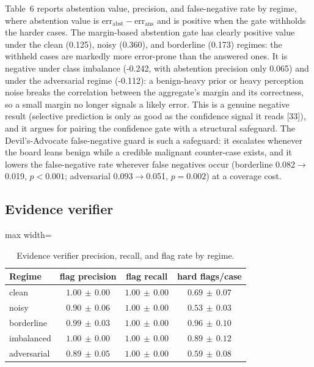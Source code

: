 \documentclass[12pt]{article}
\begin{document}
Table~6 reports abstention value, precision, and false-negative rate by regime, where abstention value is $\mathrm{err}_{\mathrm{abst}}-\mathrm{err}_{\mathrm{ans}}$ and is positive when the gate withholds the harder cases. The margin-based abstention gate has clearly positive value under the clean (0.125), noisy (0.360), and borderline (0.173) regimes: the withheld cases are markedly more error-prone than the answered ones. It is negative under class imbalance (-0.242, with abstention precision only 0.065) and under the adversarial regime (-0.112): a benign-heavy prior or heavy perception noise breaks the correlation between the aggregate's margin and its correctness, so a small margin no longer signals a likely error. This is a genuine negative result (selective prediction is only as good as the confidence signal it reads [33]), and it argues for pairing the confidence gate with a structural safeguard. The Devil's-Advocate false-negative guard is such a safeguard: it escalates whenever the board leans benign while a credible malignant counter-case exists, and it lowers the false-negative rate wherever false negatives occur (borderline 0.082$\to$0.019, $p<0.001$; adversarial 0.093$\to$0.051, $p=0.002$) at a coverage cost.

\subsection{Evidence verifier}\label{sec:ver}
\begin{table}[htbp]
\centering
\small
\renewcommand{\arraystretch}{1.25}
\setlength{\tabcolsep}{5pt}
\begin{adjustbox}{max width=\linewidth}
\begin{tabular}{|l|c|c|c|}
\hline
\rowcolor{tblhead}
\textbf{Regime} & \textbf{flag precision} & \textbf{flag recall} & \textbf{hard flags/case} \\ \hline
clean & $1.00\,{\pm}\,0.00$ & $1.00\,{\pm}\,0.00$ & $0.69\,{\pm}\,0.07$ \\
\hline
noisy & $0.90\,{\pm}\,0.06$ & $1.00\,{\pm}\,0.00$ & $0.53\,{\pm}\,0.03$ \\
\hline
borderline & $0.99\,{\pm}\,0.03$ & $1.00\,{\pm}\,0.00$ & $0.96\,{\pm}\,0.10$ \\
\hline
imbalanced & $1.00\,{\pm}\,0.00$ & $1.00\,{\pm}\,0.00$ & $0.89\,{\pm}\,0.12$ \\
\hline
adversarial & $0.89\,{\pm}\,0.05$ & $1.00\,{\pm}\,0.00$ & $0.59\,{\pm}\,0.08$ \\
\hline
\end{tabular}
\end{adjustbox}
\caption{Evidence verifier precision, recall, and flag rate by regime.}
\label{tab:verifier}
\end{table}
\end{document}
